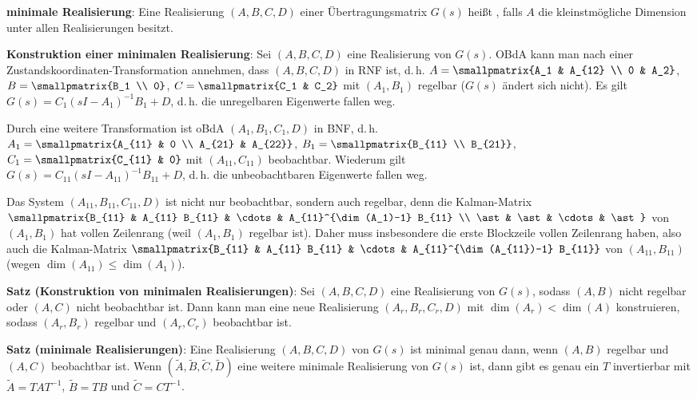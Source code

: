 \textbf{minimale Realisierung}:
Eine Realisierung $(A, B, C, D)$ einer Übertragungsmatrix $G(s)$ heißt , falls
$A$ die kleinstmögliche Dimension unter allen Realisierungen besitzt.

\linie

\textbf{Konstruktion einer minimalen Realisierung}:
Sei $(A, B, C, D)$ eine Realisierung von $G(s)$.
OBdA kann man nach einer Zustandskoordinaten-Transformation annehmen, dass $(A, B, C, D)$
in RNF ist, d.\,h.
$A = \smallpmatrix{A_1 & A_{12} \\ 0 & A_2}$, $B = \smallpmatrix{B_1 \\ 0}$,
$C = \smallpmatrix{C_1 & C_2}$ mit $(A_1, B_1)$ regelbar
($G(s)$ ändert sich nicht).
Es gilt $G(s) = C_1 (sI - A_1)^{-1} B_1 + D$, d.\,h.
die unregelbaren Eigenwerte fallen weg.

Durch eine weitere Transformation ist oBdA $(A_1, B_1, C_1, D)$ in
BNF, d.\,h.\\
$A_1 = \smallpmatrix{A_{11} & 0 \\ A_{21} & A_{22}}$, $B_1 = \smallpmatrix{B_{11} \\ B_{21}}$,
$C_1 = \smallpmatrix{C_{11} & 0}$ mit $(A_{11}, C_{11})$ beobachtbar.
Wiederum gilt\\
$G(s) = C_{11} (sI - A_{11})^{-1} B_{11} + D$, d.\,h.
die unbeobachtbaren Eigenwerte fallen weg.

Das System $(A_{11}, B_{11}, C_{11}, D)$ ist nicht nur beobachtbar, sondern auch regelbar, denn
die Kalman-Matrix
$\smallpmatrix{B_{11} & A_{11} B_{11} & \cdots & A_{11}^{\dim(A_1)-1} B_{11} \\
\ast & \ast & \cdots & \ast}$
von $(A_1, B_1)$ hat vollen Zeilenrang (weil $(A_1, B_1)$ regelbar ist).
Daher muss insbesondere die erste Blockzeile vollen Zeilenrang haben, also auch die
Kalman-Matrix $\smallpmatrix{B_{11} & A_{11} B_{11} & \cdots & A_{11}^{\dim(A_{11})-1} B_{11}}$
von $(A_{11}, B_{11})$ (wegen $\dim(A_{11}) \le \dim(A_1)$).

\linie
\pagebreak

\textbf{Satz (Konstruktion von minimalen Realisierungen)}:
Sei $(A, B, C, D)$ eine Realisierung von $G(s)$, sodass $(A, B)$ nicht regelbar oder
$(A, C)$ nicht beobachtbar ist.
Dann kann man eine neue Realisierung
$(A_r, B_r, C_r, D)$ mit $\dim(A_r) < \dim(A)$ konstruieren,
sodass $(A_r, B_r)$ regelbar und $(A_r, C_r)$ beobachtbar ist.

\textbf{Satz (minimale Realisierungen)}:
Eine Realisierung $(A, B, C, D)$ von $G(s)$ ist minimal genau dann, wenn
$(A, B)$ regelbar und $(A, C)$ beobachtbar ist.
Wenn $(\widetilde{A}, \widetilde{B}, \widetilde{C}, \widetilde{D})$ eine weitere minimale
Realisierung von $G(s)$ ist, dann gibt es genau ein $T$ invertierbar mit
$\widetilde{A} = TAT^{-1}$, $\widetilde{B} = TB$ und $\widetilde{C} = CT^{-1}$.

